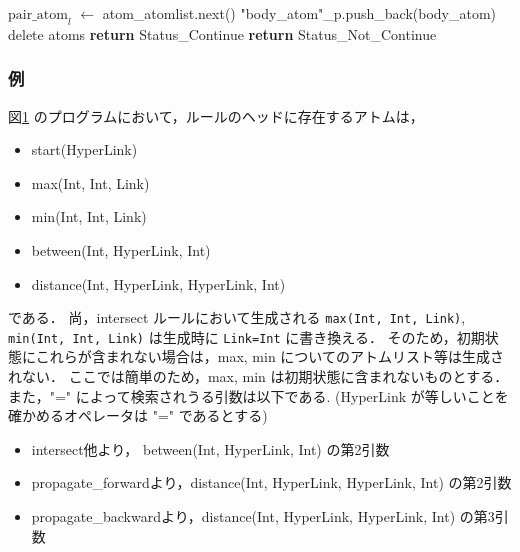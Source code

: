 \begin{algorithm}
\begin{algorithmic}[1]
                \Else
                    \State $\text{pair\_atom}_l$ $\gets$ atom\_atomlist.next()
                \EndIf
                        \State "body\_atom"\_p.push\_back(body\_atom)
                        \State delete atoms
                            \State \textbf{return} Status\_Continue
                        \EndIf
                    \EndFor
                \EndIf
            \EndLoop
        \EndLoop
        \State \textbf{return} Status\_Not\_Continue
    \EndProcedure
\end{algorithmic}
\end{algorithm}

\subsubsection{例}
\begin{figure}
    \label{ex1}
    
\end{figure}

図\ref{ex1} のプログラムにおいて，ルールのヘッドに存在するアトムは，
\begin{itemize}
    \item start(HyperLink)
    \item max(Int, Int, Link)
    \item min(Int, Int, Link)
    \item between(Int, HyperLink, Int)
    \item distance(Int, HyperLink, HyperLink, Int)
\end{itemize}
である．
尚，intersect ルールにおいて生成される \texttt{max(Int, Int, Link)}, \texttt{min(Int, Int, Link)} は生成時に \texttt{Link=Int} に書き換える．
そのため，初期状態にこれらが含まれない場合は，max, min についてのアトムリスト等は生成されない．
ここでは簡単のため，max, min は初期状態に含まれないものとする．
また，"=" によって検索されうる引数は以下である.
(HyperLink が等しいことを確かめるオペレータは "=" であるとする)
\begin{itemize}
    \item intersect他より， between(Int, HyperLink, Int) の第2引数
    \item propagate\_forwardより，distance(Int, HyperLink, HyperLink, Int) の第2引数
    \item propagate\_backwardより，distance(Int, HyperLink, HyperLink, Int) の第3引数
\end{itemize}

